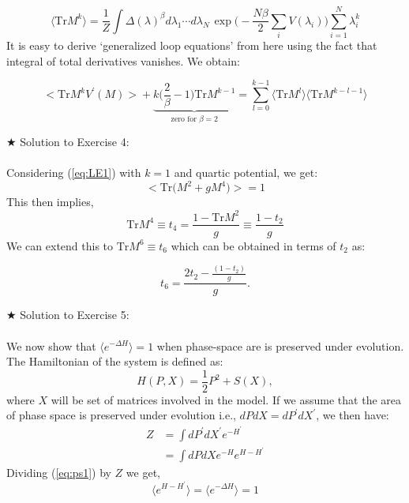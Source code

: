 \documentclass[letter,11pt]{article}
\begin{document}
\begin{equation} 
\langle \mbox{Tr} M^k  \rangle = \frac{1}{Z} \int \Delta(\lambda)^{\beta} 
	d\lambda_1 \cdots d\lambda_{N~} \exp\Bigg(-\frac{N\beta}{2} \sum_{i} V(\lambda_{i})\Bigg)  \sum_{i=1}^{N} \lambda_{i}^k
\end{equation}
It is easy to derive `generalized loop equations' from here using the fact that integral 
of total derivatives vanishes. We obtain:

\begin{equation}
		\Big< \mathrm{Tr} M^{k} V^{\prime}(M) \Big> +  \underbrace{k \Bigg(\frac{2}{\beta} - 1 \Bigg) \mathrm{Tr} M^{k-1}}_{\text{zero for $\beta=2$}} = \sum_{l=0}^{k-1} \langle \mathrm{Tr} M^{l} \rangle  \langle \mathrm{Tr} M^{k-l-1} \rangle
\end{equation}
 

\noindent $\bigstar$ Solution to Exercise 4:
\\ \\ Considering (\ref{eq:LE1}) with $k=1$ and quartic potential, we get: 
    \begin{equation}
    \Big< \mathrm{Tr}\Big(M^{2} + g M^{4}\Big) \Big> = 1 
    \end{equation}
    This then implies, 
     \begin{equation}
     \mathrm{Tr} M^{4} \equiv t_{4} = \frac{1 - \mathrm{Tr} M^{2}}{g} \equiv \frac{1 - t_2}{g} 
     \end{equation}
     We can extend this to $\mathrm{Tr} M^{6} \equiv t_{6}$ which can be obtained in terms of 
     $t_2$ as:  
     
     \begin{equation}
     	t_{6} = \frac{2t_{2} - \frac{(1-t_{2})}{g}}{g}. 
     \end{equation} 

\noindent $\bigstar$ Solution to Exercise 5:
\\ \\ We now show that $ \langle e^{-\Delta H} \rangle = 1$ when phase-space are is preserved under evolution. The Hamiltonian of the system is defined as:
\begin{equation}
	H(P,X) = \frac{1}{2}P^2  + S(X), 
\end{equation} 
where $X$ will be set of matrices involved in the model. If we assume that the area of phase space is preserved under evolution i.e., $dP dX = dP^{\prime} dX^{\prime}$, we then have:
\begin{align}
	\label{eq:ps1} 
	Z &= \int dP^{\prime} dX^{\prime} e^{-H^{\prime} \nonumber }  \\
	&=  \int dP dX e^{-H} e^{H-H^{\prime}}
\end{align}
Dividing (\ref{eq:ps1}) by $Z$ we get, 
\begin{equation}
	\langle e^{H-H^{\prime}} \rangle = 	\langle e^{-\Delta H} \rangle = 1
\end{equation}
\end{document}
